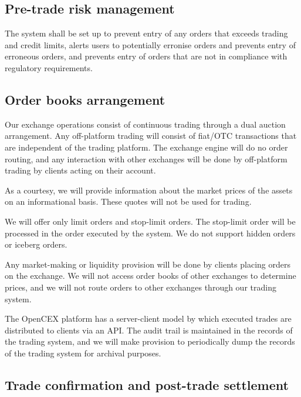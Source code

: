 \subsection{Pre-trade risk management}
The system shall be set up to prevent entry of any orders that exceeds
trading and credit limits, alerts users to potentially erronise orders
and prevents entry of erroneous orders, and prevents entry of orders
that are not in compliance with regulatory requirements.

\subsection{Order books arrangement}

Our exchange operations consist of continuous trading through a dual
auction arrangement.  Any off-platform trading will consist of
fiat/OTC transactions that are independent of the trading platform.
The exchange engine will do no order routing, and any interaction with
other exchanges will be done by off-platform trading by clients acting
on their account.

As a courtesy, we will provide information about the market prices of
the assets on an informational basis.  These quotes will not be used
for trading.

We will offer only limit orders and stop-limit orders.  The stop-limit
order will be processed in the order executed by the system.  We do
not support hidden orders or iceberg orders.

Any market-making or liquidity provision will be done by clients
placing orders on the exchange.  We will not access order books of
other exchanges to determine prices, and we will not route orders to
other exchanges through our trading system.

The OpenCEX platform has a server-client model by which executed
trades are distributed to clients via an API.  The audit trail is
maintained in the records of the trading system, and we will make
provision to periodically dump the records of the trading system for
archival purposes.


\subsection{Trade confirmation and post-trade settlement}

